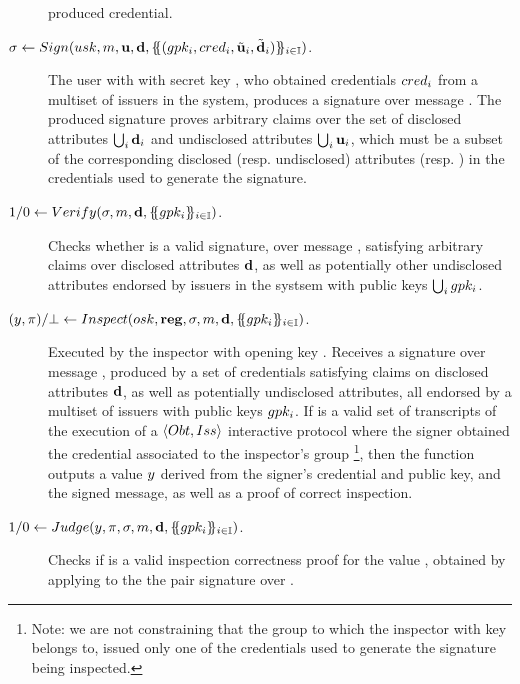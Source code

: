 \begin{description}
  produced credential.
\item[$\sigma \gets Sign(usk,m,\mathbf{u},\mathbf{d},
  \{\mskip-5mu\{ (gpk_i,cred_i,\tilde{\mathbf{u}}_i,\tilde{\mathbf{d}}_i)\}\mskip-5mu\}_{i \in \mathbb{I}})$.]
  The user with with secret key \usk, who obtained credentials $cred_i$ from a
  multiset of issuers in the system, produces a signature \sig over message
  \msg. The produced signature proves arbitrary claims over the set of
  disclosed attributes $\bigcup_i \mathbf{d}_i$ and undisclosed attributes
  $\bigcup_i \mathbf{u}_i$, which must be a subset of the corresponding disclosed
  (resp. undisclosed) attributes \tdattrs (resp. \tuattrs) in the credentials
  used to generate the signature.
\item[$1/0 \gets
  Verify(\sigma,m,\mathbf{d}, \{\mskip-5mu\{ gpk_i \}\mskip-5mu\}_{i \in \mathbb{I}})$.]
  Checks whether \sig is a valid signature, over message \msg, satisfying
  arbitrary claims over disclosed attributes $\mathbf{d}$, as well as
  potentially other undisclosed attributes endorsed by issuers in the systsem
  with public keys $\bigcup_i gpk_i$.
\item[$(y,\pi)/\bot \gets
  Inspect(osk,\mathbf{reg},\sigma,m,\mathbf{d},
  \{\mskip-5mu\{ gpk_i \}\mskip-5mu\}_{i \in \mathbb{I}})$.] %
  Executed by the inspector with opening key \osk. Receives a signature \sig
  over message \msg, produced by a set of credentials satisfying claims on
  disclosed attributes $\mathbf{d}$, as well as potentially undisclosed
  attributes, all endorsed by a multiset of issuers with public keys $gpk_i$. 
  If \trans is a valid set of transcripts of the execution of a
  $\langle Obt,Iss\rangle$ interactive protocol where the signer obtained
  the credential associated to the inspector's group%
  \footnote{Note: we are not constraining that the group to which the inspector
    with key \osk belongs to, issued only one of the credentials used to
    generate the signature being inspected.}, then the function outputs
  a value $y$ derived from the signer's credential and public key, and the
  signed message, as well as a proof of correct inspection.
\item[$1/0 \gets Judge(y,\pi,\sigma,m,\mathbf{d},
  \{\mskip-5mu\{ gpk_i\}\mskip-5mu\}_{i \in \mathbb{I}})$.] %
  Checks if \iproof is a valid inspection correctness proof for the value \y,
  obtained by applying \Inspect to the the pair signature \sig over \msg. 
\end{description}

